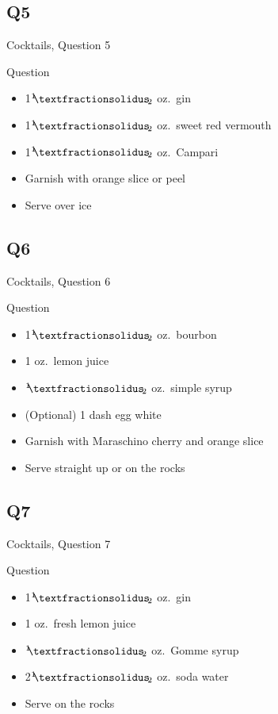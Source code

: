 \documentclass[11pt]{beamer}
\begin{document}
\subsection*{Q5}
\begin{frame}[t]{Cocktails, Question 5}
\begin{block}{Question}
\begin{itemize}
\item 1\({}^1{\mskip -5mu⁄\mskip -3mu}_2\) oz.\ gin
\item 1\({}^1{\mskip -5mu⁄\mskip -3mu}_2\) oz.\ sweet red vermouth
\item 1\({}^1{\mskip -5mu⁄\mskip -3mu}_2\) oz.\ Campari
\item Garnish with orange slice or peel
\item Serve over ice
\end{itemize}
\end{block}
\end{frame}
\subsection*{Q6}
\begin{frame}[t]{Cocktails, Question 6}
\begin{block}{Question}
\begin{itemize}
\item 1\({}^1{\mskip -5mu⁄\mskip -3mu}_2\) oz.\ bourbon
\item 1 oz.\ lemon juice
\item \({}^1{\mskip -5mu⁄\mskip -3mu}_2\) oz.\ simple syrup
\item (Optional) 1 dash egg white
\item Garnish with Maraschino cherry and orange slice
\item Serve straight up or on the rocks
\end{itemize}
\end{block}
\end{frame}
\subsection*{Q7}
\begin{frame}[t]{Cocktails, Question 7}
\begin{block}{Question}
\begin{itemize}
\item 1\({}^1{\mskip -5mu⁄\mskip -3mu}_2\) oz.\ gin
\item 1 oz.\ fresh lemon juice
\item \({}^1{\mskip -5mu⁄\mskip -3mu}_2\) oz.\ Gomme syrup
\item 2\({}^1{\mskip -5mu⁄\mskip -3mu}_2\) oz.\ soda water
\item Serve on the rocks
\end{itemize}
\end{block}
\end{frame}
\end{document}
